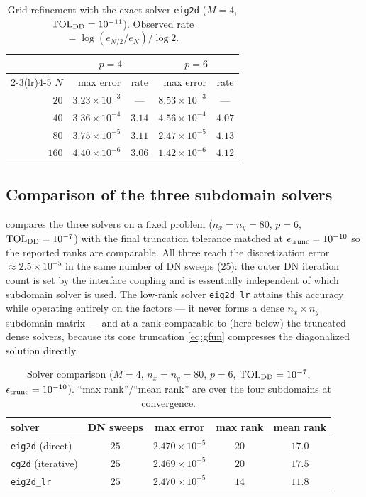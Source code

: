 \documentclass[hidelinks,onefignum,onetabnum]{siamart250211}
\newcommand{\TOL}{\mathrm{TOL}}
\begin{document}
\begin{table}[htb]
\caption{Grid refinement with the exact solver {\tt eig2d} ($M=4$,
$\TOL_{\rm DD}=10^{-11}$).  Observed rate $=\log(e_{N/2}/e_N)/\log 2$.
\label{tab:refine}}
\begin{center}
\begin{tabular}{r r c r c}
\toprule
 & \multicolumn{2}{c}{$p=4$} & \multicolumn{2}{c}{$p=6$} \\
\cmidrule(lr){2-3}\cmidrule(lr){4-5}
$N$ & max error & rate & max error & rate \\
\midrule
$20$  & $3.23\times10^{-3}$ & ---  & $8.53\times10^{-3}$ & ---  \\
$40$  & $3.36\times10^{-4}$ & $3.14$ & $4.56\times10^{-4}$ & $4.07$ \\
$80$  & $3.75\times10^{-5}$ & $3.11$ & $2.47\times10^{-5}$ & $4.13$ \\
$160$ & $4.40\times10^{-6}$ & $3.06$ & $1.42\times10^{-6}$ & $4.12$ \\
\bottomrule
\end{tabular}
\end{center}
\end{table}

\subsection{Comparison of the three subdomain solvers}
 compares the three solvers on a fixed problem
($n_x=n_y=80$, $p=6$, $\TOL_{\rm DD}=10^{-7}$) with the final truncation
tolerance matched at $\epsilon_{\rm trunc}=10^{-10}$ so the reported ranks are
comparable.  All three reach the discretization error
$\approx 2.5\times10^{-5}$ in the same number of DN sweeps ($25$): the outer DN
iteration count is set by the interface coupling and is essentially independent
of which subdomain solver is used.  The low-rank solver {\tt eig2d\_lr} attains
this accuracy while operating entirely on the factors --- it never forms a dense
$n_x\times n_y$ subdomain matrix --- and at a rank comparable to (here below) the
truncated dense solvers, because its core truncation \cref{eq:gfun} compresses
the diagonalized solution directly.

\begin{table}[htb]
\caption{Solver comparison ($M=4$, $n_x=n_y=80$, $p=6$, $\TOL_{\rm DD}=10^{-7}$,
$\epsilon_{\rm trunc}=10^{-10}$).  ``max rank''/``mean rank'' are over the four
subdomains at convergence.\label{tab:solvers}}
\begin{center}
\begin{tabular}{l c c c c}
\toprule
solver & DN sweeps & max error & max rank & mean rank \\
\midrule
{\tt eig2d} (direct)    & $25$ & $2.470\times10^{-5}$ & $20$ & $17.0$ \\
{\tt cg2d} (iterative)  & $25$ & $2.469\times10^{-5}$ & $20$ & $17.5$ \\
{\tt eig2d\_lr}         & $25$ & $2.470\times10^{-5}$ & $14$ & $11.8$ \\
\bottomrule
\end{tabular}
\end{center}
\end{table}
\end{document}
